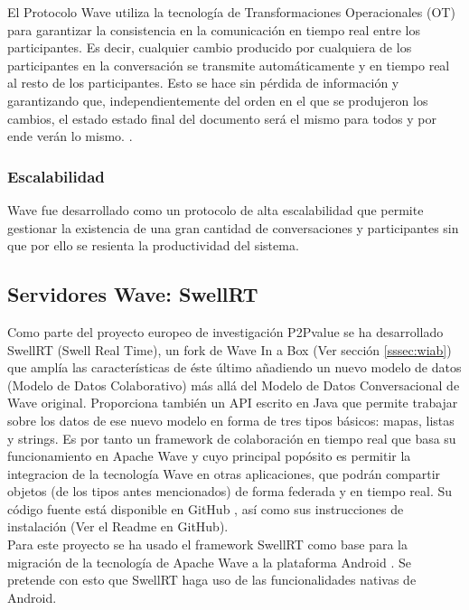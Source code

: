     El Protocolo Wave \cite{ref:wave_over_xmpp} utiliza la tecnología de Transformaciones Operacionales (OT) \cite{ref:how_ot_works} para garantizar la consistencia en la comunicación en tiempo real entre los participantes. Es decir, cualquier cambio producido por cualquiera de los participantes en la conversación se transmite automáticamente y en tiempo real al resto de los participantes. Esto se hace sin pérdida de información y garantizando que, independientemente del orden en el que se produjeron los cambios, el estado estado final del documento será el mismo para todos y por ende verán lo mismo. \cite{ref:wave_ot}.
    
    \subsubsection{Escalabilidad}
    
    Wave fue desarrollado como un protocolo de alta escalabilidad que permite gestionar la existencia de una gran cantidad de conversaciones y participantes sin que por ello se resienta la productividad del sistema.
    
    \subsection{Servidores Wave: SwellRT}\label{sssec:swellRT}
    
    Como parte del proyecto europeo de investigación P2Pvalue \cite{ref:p2pvalue} se ha desarrollado SwellRT (Swell Real Time), un fork de Wave In a Box (Ver sección \ref{sssec:wiab}) que amplía las características de éste último añadiendo un nuevo modelo de datos (Modelo de Datos Colaborativo) más allá del Modelo de Datos Conversacional de Wave original. Proporciona también un API escrito en Java que permite trabajar sobre los datos de ese nuevo modelo en forma de tres tipos básicos: mapas, listas y strings. Es por tanto un framework de colaboración en tiempo real que basa su funcionamiento en Apache Wave y cuyo principal popósito es permitir la integracion de la tecnología Wave en otras aplicaciones, que podrán compartir objetos (de los tipos antes mencionados) de forma federada y en tiempo real. Su código fuente está disponible en GitHub \cite{ref:swellRT_github}, así como sus instrucciones de instalación (Ver el Readme en GitHub).\\[.2cm]

    Para este proyecto se ha usado el framework SwellRT como base para la migración de la tecnología de Apache Wave a la plataforma Android \cite{ref:android_platform}. Se pretende con esto que SwellRT haga uso de las funcionalidades nativas de Android.
    
